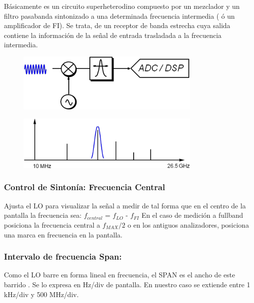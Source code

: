 \documentclass[a4paper,12pt,twoside]{article}
\begin{document}
Básicamente es un circuito superheterodino compuesto por un mezclador y un filtro pasabanda
sintonizado a una determinada frecuencia intermedia ( ó un amplificador de FI). Se trata, de un
receptor de banda estrecha cuya salida contiene la información de la señal de entrada
trasladada a la frecuencia intermedia.
\begin{figure}[H]
    \centering
    \includegraphics[width=0.8\textwidth]{../img/sintonizado.png}
\end{figure}
\begin{figure}[H]
    \centering
    \includegraphics[width=0.8\textwidth]{../img/sintonizado2.png}
\end{figure}

\subsubsection{Control de Sintonía: Frecuencia Central}

Ajusta el LO para visualizar la señal a medir de tal forma que en el centro de la pantalla la
frecuencia sea: $f_{central}$ = $f_{LO}$ - $f_{FI}$
En el caso de medición a fullband posiciona la frecuencia central a $f_{MAX} / 2$ o en los antiguos
analizadores, posiciona una marca en frecuencia en la pantalla.

\subsubsection{Intervalo de frecuencia Span:}

Como el LO barre en forma lineal en frecuencia, el SPAN es el ancho de este barrido . Se lo
expresa en Hz/div de pantalla. En nuestro caso se extiende entre 1 kHz/div y 500 MHz/div.
\end{document}
